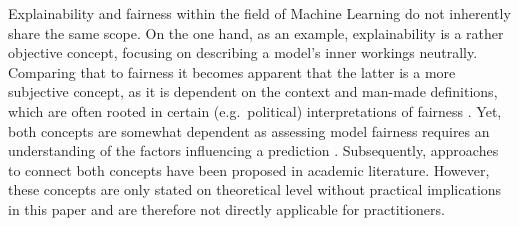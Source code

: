 
Explainability and fairness within the field of Machine Learning do not inherently share the same scope. On the one hand, as an example, explainability is a rather objective concept, focusing on describing a model's inner workings neutrally. 
Comparing that to fairness it becomes apparent that the latter is a more subjective concept, as it is dependent on the context and man-made definitions, which are often rooted in certain (e.g.\ political) interpretations of fairness \parencite{Deepak2021}.
Yet, both concepts are somewhat dependent as assessing model fairness requires an understanding of the factors influencing a prediction \parencite{Zhou2022}.
Subsequently, approaches to connect both concepts have been proposed in academic literature. 
However, these concepts are only stated on theoretical level without practical implications in this paper and are therefore not directly applicable for practitioners.





